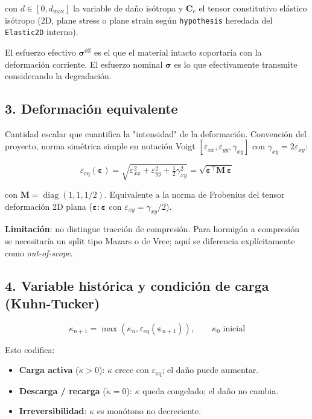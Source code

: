 \documentclass[11pt,letterpaper,oneside]{report}
\begin{document}
con $d \in [0, d_\text{max}]$ la variable de daño isótropa y $\mathbf C_e$ el tensor constitutivo elástico isótropo (2D, plane stress o plane strain según \texttt{hypothesis} heredada del \texttt{Elastic2D} interno).

El esfuerzo efectivo $\boldsymbol\sigma^\text{eff}$ es el que el material intacto soportaría con la deformación corriente. El esfuerzo nominal $\boldsymbol\sigma$ es lo que efectivamente transmite considerando la degradación.

\subsection{3. Deformación equivalente}

Cantidad escalar que cuantifica la "intensidad" de la deformación. Convención del proyecto, norma simétrica simple en notación Voigt $[\varepsilon_{xx}, \varepsilon_{yy}, \gamma_{xy}]$ con $\gamma_{xy} = 2\varepsilon_{xy}$:

\[
\varepsilon_\text{eq}(\boldsymbol\varepsilon) = \sqrt{\varepsilon_{xx}^2 + \varepsilon_{yy}^2 + \tfrac{1}{2}\gamma_{xy}^2} = \sqrt{\boldsymbol\varepsilon^\top \mathbf M\,\boldsymbol\varepsilon}
\]

con $\mathbf M = \operatorname{diag}(1, 1, 1/2)$. Equivalente a la norma de Frobenius del tensor deformación 2D plana ($\boldsymbol\varepsilon : \boldsymbol\varepsilon$ con $\varepsilon_{xy} = \gamma_{xy}/2$).

\textbf{Limitación}: no distingue tracción de compresión. Para hormigón a compresión se necesitaría un split tipo Mazars o de Vree; aquí se diferencia explícitamente como \textit{out-of-scope}.

\subsection{4. Variable histórica y condición de carga (Kuhn-Tucker)}

\[
\kappa_{n+1} = \max(\kappa_n, \varepsilon_\text{eq}(\boldsymbol\varepsilon_{n+1})), \qquad \kappa_0 \text{ inicial}
\]

Esto codifica:
\begin{itemize}
  \item \textbf{Carga activa} ($\dot\kappa > 0$): $\kappa$ crece con $\varepsilon_\text{eq}$; el daño puede aumentar.
  \item \textbf{Descarga / recarga} ($\dot\kappa = 0$): $\kappa$ queda congelado; el daño no cambia.
  \item \textbf{Irreversibilidad}: $\kappa$ es monótono no decreciente.
\end{itemize}
\end{document}
